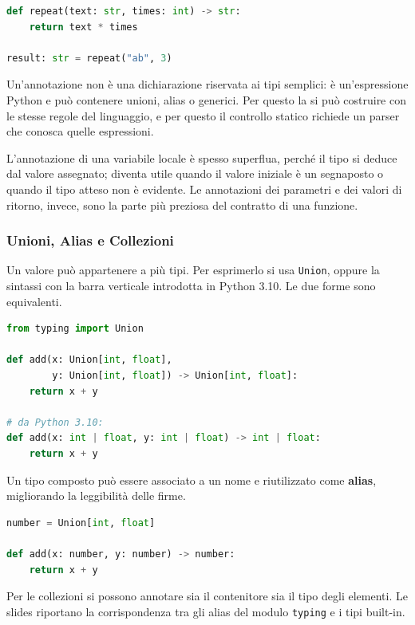 \documentclass[12pt]{extarticle}
\begin{document}
\begin{lstlisting}[language=Python]
def repeat(text: str, times: int) -> str:
    return text * times

result: str = repeat("ab", 3)
\end{lstlisting}

\noindent Un'annotazione non è una dichiarazione riservata ai tipi semplici: è un'espressione Python e può contenere unioni, alias o generici. Per questo la si può costruire con le stesse regole del linguaggio, e per questo il controllo statico richiede un parser che conosca quelle espressioni.

\noindent L'annotazione di una variabile locale è spesso superflua, perché il tipo si deduce dal valore assegnato; diventa utile quando il valore iniziale è un segnaposto o quando il tipo atteso non è evidente. Le annotazioni dei parametri e dei valori di ritorno, invece, sono la parte più preziosa del contratto di una funzione.

\subsubsection{Unioni, Alias e Collezioni}

\noindent Un valore può appartenere a più tipi. Per esprimerlo si usa \texttt{Union}, oppure la sintassi con la barra verticale introdotta in Python 3.10. Le due forme sono equivalenti.

\begin{lstlisting}[language=Python]
from typing import Union

def add(x: Union[int, float],
        y: Union[int, float]) -> Union[int, float]:
    return x + y

# da Python 3.10:
def add(x: int | float, y: int | float) -> int | float:
    return x + y
\end{lstlisting}

\noindent Un tipo composto può essere associato a un nome e riutilizzato come \textbf{alias}, migliorando la leggibilità delle firme.

\begin{lstlisting}[language=Python]
number = Union[int, float]

def add(x: number, y: number) -> number:
    return x + y
\end{lstlisting}

\noindent Per le collezioni si possono annotare sia il contenitore sia il tipo degli elementi. Le slides riportano la corrispondenza tra gli alias del modulo \texttt{typing} e i tipi built-in.
\end{document}

